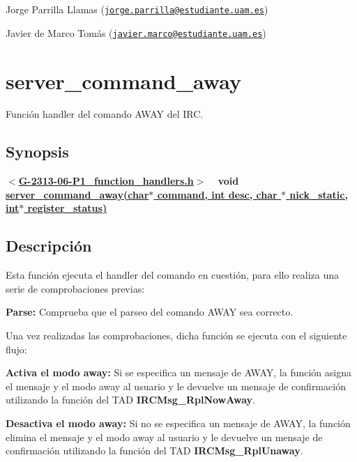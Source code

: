 \begin{DoxyItemize}
\item Jorge Parrilla Llamas (\href{mailto:jorge.parrilla@estudiante.uam.es}{\tt jorge.\+parrilla@estudiante.\+uam.\+es}) 
\item Javier de Marco Tomás (\href{mailto:javier.marco@estudiante.uam.es}{\tt javier.\+marco@estudiante.\+uam.\+es}) 
\end{DoxyItemize}\hypertarget{server_command_away}{}\section{server\+\_\+command\+\_\+away}\label{server_command_away}
Función handler del comando A\+W\+A\+Y del I\+R\+C.\hypertarget{server_command_away_synopsis_away}{}\subsection{Synopsis}\label{server_command_away_synopsis_away}
{ {\bfseries $<$\hyperlink{G-2313-06-P1__function__handlers_8h}{G-\/2313-\/06-\/\+P1\+\_\+function\+\_\+handlers.\+h}$>$} ~\newline
 {\bfseries void \hyperlink{G-2313-06-P1__function__handlers_8c_a327516a6c48e34b58428f7a502938928}{server\+\_\+command\+\_\+away(char$\ast$ command, int desc, char $\ast$ nick\+\_\+static, int$\ast$ register\+\_\+status)}} } \hypertarget{server_command_away_descripcion_away}{}\subsection{Descripción}\label{server_command_away_descripcion_away}
Esta función ejecuta el handler del comando en cuestión, para ello realiza una serie de comprobaciones previas\+:


\begin{DoxyItemize}
\item {\bfseries Parse\+:} Comprueba que el parseo del comando A\+W\+A\+Y sea correcto. 
\end{DoxyItemize}

Una vez realizadas las comprobaciones, dicha función se ejecuta con el siguiente flujo\+:


\begin{DoxyItemize}
\item {\bfseries Activa el modo away\+:} Si se especifica un mensaje de A\+W\+A\+Y, la función asigna el mensaje y el modo away al usuario y le devuelve un mensaje de confirmación utilizando la función del T\+A\+D {\bfseries I\+R\+C\+Msg\+\_\+\+Rpl\+Now\+Away}.  
\item {\bfseries Desactiva el modo away\+:} Si no se especifica un mensaje de A\+W\+A\+Y, la función elimina el mensaje y el modo away al usuario y le devuelve un mensaje de confirmación utilizando la función del T\+A\+D {\bfseries I\+R\+C\+Msg\+\_\+\+Rpl\+Unaway}.  
\end{DoxyItemize}

